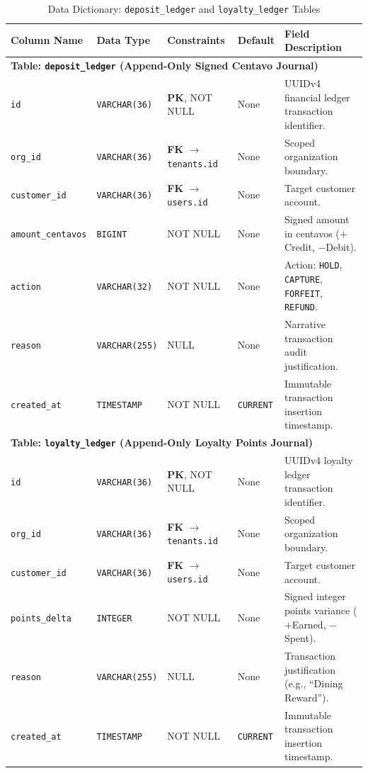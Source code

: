 \begin{table}[htbp]
\centering
\caption{Data Dictionary: \texttt{deposit\_ledger} and \texttt{loyalty\_ledger} Tables}
\label{tab:dict_ledgers}
\small
\begin{tabularx}{\textwidth}{llp{3.2cm}lX}
\toprule
\textbf{Column Name} & \textbf{Data Type} & \textbf{Constraints} & \textbf{Default} & \textbf{Field Description} \\
\midrule
\multicolumn{5}{l}{\textbf{Table: \texttt{deposit\_ledger} (Append-Only Signed Centavo Journal)}} \\
\texttt{id} & \texttt{VARCHAR(36)} & \textbf{PK}, NOT NULL & None & UUIDv4 financial ledger transaction identifier. \\
\texttt{org\_id} & \texttt{VARCHAR(36)} & \textbf{FK} $\to$ \texttt{tenants.id} & None & Scoped organization boundary. \\
\texttt{customer\_id}& \texttt{VARCHAR(36)}& \textbf{FK} $\to$ \texttt{users.id} & None & Target customer account. \\
\texttt{amount\_centavos}& \texttt{BIGINT} & NOT NULL & None & Signed amount in centavos ($+$Credit, $-$Debit). \\
\texttt{action} & \texttt{VARCHAR(32)} & NOT NULL & None & Action: \texttt{HOLD}, \texttt{CAPTURE}, \texttt{FORFEIT}, \texttt{REFUND}. \\
\texttt{reason} & \texttt{VARCHAR(255)} & NULL & None & Narrative transaction audit justification. \\
\texttt{created\_at} & \texttt{TIMESTAMP} & NOT NULL & \texttt{CURRENT} & Immutable transaction insertion timestamp. \\
\midrule
\multicolumn{5}{l}{\textbf{Table: \texttt{loyalty\_ledger} (Append-Only Loyalty Points Journal)}} \\
\texttt{id} & \texttt{VARCHAR(36)} & \textbf{PK}, NOT NULL & None & UUIDv4 loyalty ledger transaction identifier. \\
\texttt{org\_id} & \texttt{VARCHAR(36)} & \textbf{FK} $\to$ \texttt{tenants.id} & None & Scoped organization boundary. \\
\texttt{customer\_id}& \texttt{VARCHAR(36)}& \textbf{FK} $\to$ \texttt{users.id} & None & Target customer account. \\
\texttt{points\_delta}& \texttt{INTEGER} & NOT NULL & None & Signed integer points variance ($+$Earned, $-$Spent). \\
\texttt{reason} & \texttt{VARCHAR(255)} & NULL & None & Transaction justification (e.g., ``Dining Reward''). \\
\texttt{created\_at} & \texttt{TIMESTAMP} & NOT NULL & \texttt{CURRENT} & Immutable transaction insertion timestamp. \\
\bottomrule
\end{tabularx}
\end{table}

